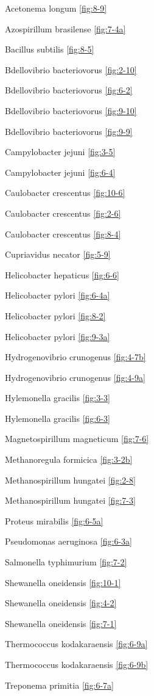 \documentclass[]{tufte-book}
\begin{document}
Acetonema longum \ref{fig:8-9}

Azospirillum brasilense \ref{fig:7-4a}

Bacillus subtilis \ref{fig:8-5}

Bdellovibrio bacteriovorus \ref{fig:2-10}

Bdellovibrio bacteriovorus \ref{fig:6-2}

Bdellovibrio bacteriovorus \ref{fig:9-10}

Bdellovibrio bacteriovorus \ref{fig:9-9}

Campylobacter jejuni \ref{fig:3-5}

Campylobacter jejuni \ref{fig:6-4}

Caulobacter crescentus \ref{fig:10-6}

Caulobacter crescentus \ref{fig:2-6}

Caulobacter crescentus \ref{fig:8-4}

Cupriavidus necator \ref{fig:5-9}

Helicobacter hepaticus \ref{fig:6-6}

Helicobacter pylori \ref{fig:6-4a}

Helicobacter pylori \ref{fig:8-2}

Helicobacter pylori \ref{fig:9-3a}

Hydrogenovibrio crunogenus \ref{fig:4-7b}

Hydrogenovibrio crunogenus \ref{fig:4-9a}

Hylemonella gracilis \ref{fig:3-3}

Hylemonella gracilis \ref{fig:6-3}

Magnetospirillum magneticum \ref{fig:7-6}

Methanoregula formicica \ref{fig:3-2b}

Methanospirillum hungatei \ref{fig:2-8}

Methanospirillum hungatei \ref{fig:7-3}

Proteus mirabilis \ref{fig:6-5a}

Pseudomonas aeruginosa \ref{fig:6-3a}

Salmonella typhimurium \ref{fig:7-2}

Shewanella oneidensis \ref{fig:10-1}

Shewanella oneidensis \ref{fig:4-2}

Shewanella oneidensis \ref{fig:7-1}

Thermococcus kodakaraensis \ref{fig:6-9a}

Thermococcus kodakaraensis \ref{fig:6-9b}

Treponema primitia \ref{fig:6-7a}
\end{document}

